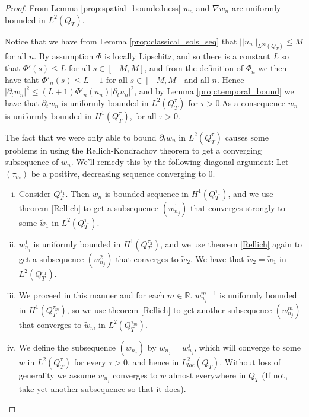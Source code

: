 \documentclass[11pt, a4paper]{article}
\begin{document}
\begin{proof}
From Lemma \ref{prop:spatial_boundedness} $w_n$ and $\nabla w_n$ are uniformly bounded in $L^2(Q_T)$.

Notice that we have from Lemma \ref{prop:classical_sols_seq} that $||u_n||_{L^\infty(Q_T)} \leq M$ for all $n$. By assumption $\Phi$ is locally Lipschitz, and so there is a constant $L$ so that $\Phi'(s) \leq L$ for all $s \in [-M, M]$, and from the definition of $\Phi_n$ we then have taht $\Phi'_n(s) \leq L+1$ for all $s\in [-M,M]$ and all $n$. Hence $|\partial_t w_n|^2 \leq  (L+1)\Phi'_n(u_n)|\partial_t u_n|^2$, and by Lemma \ref{prop:temporal_bound} we have that $\partial_t w_n$ is uniformly bounded in $L^2(Q_T^\tau)$ for $\tau > 0$.As a consequence $w_n$ is uniformly bounded in $H^1(Q_T^\tau)$, for all $\tau > 0$.

 The fact that we were only able to bound $\partial_t w_n$ in $L^2(Q_T^\tau)$ causes some problems in using the Rellich-Kondrachov theorem to get a converging subsequence of $w_n$. We'll remedy this by the following diagonal argument:
	Let $(\tau_m)$ be a positive, decreasing sequence converging to $0$.
	\begin{enumerate}[i)]
	\item Consider $Q_T^{\tau_1}$. Then $w_n$ is bounded sequence in $H^1(Q_T^{\tau_1})$, and we use theorem \ref{Rellich} to get a subsequence $(w_{n_j}^1)$ that converges strongly to some $\tilde{w}_1$ in $L^2(Q_T^{\tau_1})$.
	
	\item $w_{n_j}^1$ is uniformly bounded in $H^1(Q_T^{\tau_2})$, and we use theorem \ref{Rellich} again to get a subsequence $(w_{n_j}^2)$ that converges to $\tilde{w}_2$. We have that $\tilde{w}_2 = \tilde{w}_1$ in $L^2(Q_T^{\tau_1})$.
	
	\item We proceed in this manner and for each $m \in \mathbb{R}$. $w_{n_j}^{m-1}$ is uniformly bounded in $H^1(Q_T^{\tau_m})$, so we use theorem \ref{Rellich} to get another subsequence $(w_{n_j}^m)$ that converges to $\tilde{w}_m$ in $L^2(Q_T^{\tau_m})$.
	
	\item We define the subsequence $(w_{n_j})$ by $w_{n_j} = w_{n_j}^j$, which will converge to some $w$ in $L^2(Q_T^\tau)$ for every $\tau > 0$, and hence in $L^2_{loc}(Q_T)$. Without loss of generality we assume $w_{n_j}$ converges to $w$ almost everywhere in $Q_T$ (If not, take yet another subsequence so that it does).
\end{enumerate}	 


\end{proof}
\end{document}
